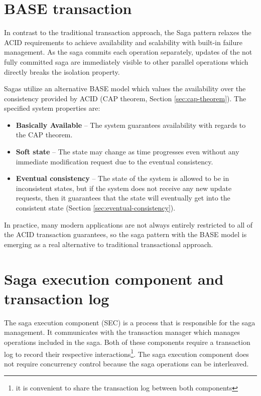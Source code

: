 \documentclass[oneside,
  digital, %
  table,   %
  lof,     %
  lot,     %
]{fithesis3}
\begin{document}
\section{BASE transaction}
\label{sec:base}

In contrast to the traditional transaction approach, the Saga pattern relaxes the ACID requirements to achieve availability and scalability with built-in failure management. As the saga commits each operation separately, updates of the not fully committed saga are immediately visible to other parallel operations \cite{trans_concept} which directly breaks the isolation property.

Sagas utilize an alternative BASE model \cite{life-beyond-dist-tran-helland, building-on-quicksand} which values the availability over the consistency provided by ACID (CAP theorem, Section \ref{sec:cap-theorem}). The specified system properties are:

\begin{itemize}
    \item \textbf{Basically Available} -- The system guarantees availability with regards to the CAP theorem.
    
    \item \textbf{Soft state} -- The state may change as time progresses even without any immediate modification request due to the eventual consistency.
    
    \item \textbf{Eventual consistency} -- The state of the system is allowed to be in inconsistent states, but if the system does not receive any new update requests, then it guarantees that the state will eventually get into the consistent state (Section \ref{sec:eventual-consistency}).
\end{itemize}

In practice, many modern applications are not always entirely restricted to all of the ACID transaction guarantees, so the saga pattern with the BASE model is emerging as a real alternative to traditional transactional approach.

\section{Saga execution component and transaction log}

The saga execution component (SEC) is a process that is responsible for the saga management. It communicates with the transaction manager which manages operations included in the saga. Both of these components require a transaction log to record their respective interactions\footnote{it is convenient to share the transaction log between both components}. The saga execution component does not require concurrency control because the saga operations can be interleaved.
\end{document}
